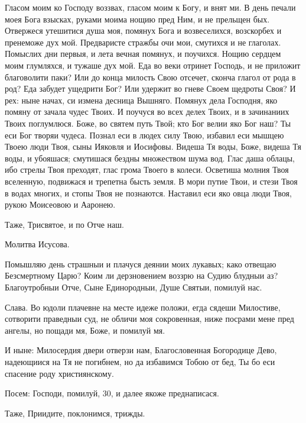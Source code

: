 Гласом моим ко Господу воззвах, гласом моим к Богу, и внят ми. В день печали моея Бога взысках, руками моима нощию пред Ним, и не прельщен бых. Отвержеся утешитися душа моя, помянух Бога и возвеселихся, возскорбех и пренеможе дух мой. Предваристе стражбы очи мои, смутихся и не глаголах. Помыслих дни первыя, и лета вечная помянух, и поучихся. Нощию сердцем моим глумляхся, и тужаше дух мой. Еда во веки отринет Господь, и не приложит благоволити паки? Или до конца милость Свою отсечет, сконча глагол от рода в род? Еда забудет ущедрити Бог? Или удержит во гневе Своем щедроты Своя? И рех: ныне начах, си измена десница Вышняго. Помянух дела Господня, яко помяну от зачала чудес Твоих. И поучуся во всех делех Твоих, и в зачинаниих Твоих поглумлюся. Боже, во святем путь Твой; кто Бог велии яко Бог наш? Ты еси Бог творяи чудеса. Познал еси в людех силу Твою, избавил еси мышцею Твоею люди Твоя, сыны Ияковля и Иосифовы. Видеша Тя воды, Боже, видеша Тя воды, и убояшася; смутишася бездны множеством шума вод. Глас даша облацы, ибо стрелы Твоя преходят, глас грома Твоего в колеси. Осветиша молния Твоя вселенную, подвижася и трепетна бысть земля. В мори путие Твои, и стези Твоя в водах многих, и стопы Твоя не познаются. Наставил еси яко овца люди Твоя, рукою Моисеовою и Ааронею.

Таже, Трисвятое, и по Отче наш.

Молитва Исусова.




Помышляю день страшныи и плачуся деянии моих лукавых; како отвещаю Безсмертному Царю? Коим ли дерзновением воззрю на Судию блудныи аз? Благоутробныи Отче, Сыне Единородныи, Душе Святыи, помилуй нас.

Слава. Во юдоли плачевне на месте идеже положи, егда сядеши Милостиве, сотворити праведныи суд, не обличи моя сокровенная, ниже посрами мене пред ангелы, но пощади мя, Боже, и помилуй мя.

И ныне: Милосердия двери отверзи нам, Благословенная Богородице Дево, надеющиися на Тя  не  погибнем, но да избавимся Тобою от бед, Ты бо еси спасение роду християнскому.

Посем: Господи, помилуй, 30, и далее якоже преднаписася.

Таже, Приидите, поклонимся, трижды.




